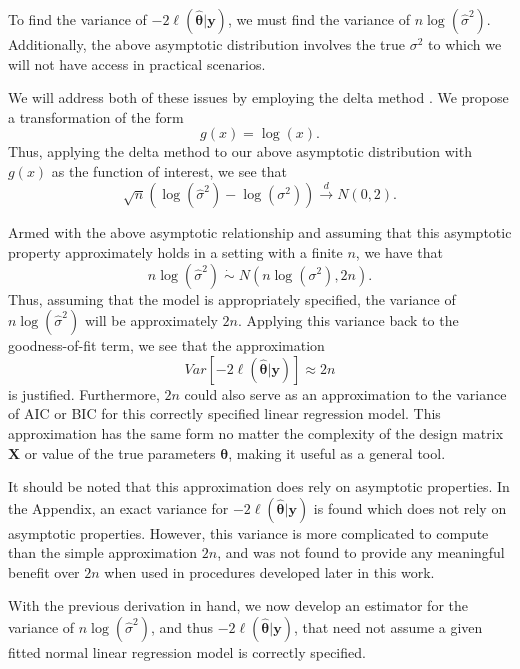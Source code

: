 \documentclass[review]{elsarticle}
\begin{document}
		To find the variance of $-2 \ell (\hat{\bm{\theta}} | \bm{y}  )$, we must find the variance of $n \log(\hat{\sigma}^2)$.
		Additionally, the above asymptotic distribution involves the true $\sigma^2$ to which we will not have access in practical scenarios.

		We will address both of these issues by employing the delta method \citep{Rao}. We propose a transformation of the form
		\begin{equation*}
			g(x) = \log(x) .
		\end{equation*}
		Thus, applying the delta method to our above asymptotic distribution with $g(x)$ as the function of interest, we see that
		\begin{equation*}
			\sqrt{n} ( \log (\hat{\sigma}^2) - \log(\sigma^2)) \xrightarrow[]{d} N(0, 2) .
		\end{equation*}

		Armed with the above asymptotic relationship and assuming that this asymptotic property approximately holds in a setting with a finite $n$, we have that
		\begin{equation*}
			n\log(\hat{\sigma}^2) \; \dot\sim \; N \left( n\log(\sigma^2), 2n \right) .
		\end{equation*}
		Thus, assuming that the model is appropriately specified, the variance of $n\log(\hat{\sigma}^2)$ will be approximately $2n$. Applying this variance back to the goodness-of-fit term,
		we see that the approximation
		\begin{equation*}
			Var \left[ -2 \ell (\hat{\bm{\theta}} | \bm{y}  ) \right] \approx 2n
		\end{equation*}
		is justified. Furthermore, $2n$ could also serve as an approximation to the variance of AIC or BIC for this correctly specified linear regression model. This approximation
		has the same form no matter the complexity of the design matrix $\bm{X}$ or value of the true parameters $\bm{\theta}$, making it useful as a
		general tool.

		It should be noted that this approximation does rely on asymptotic properties. In the Appendix, an exact variance for $-2 \ell (\hat{\bm{\theta}} | \bm{y})$ is found which does
		not rely on asymptotic properties. However, this variance is more complicated to compute than the simple approximation $2n$, and was not found to provide any meaningful
		benefit over $2n$ when used in procedures developed later in this work.

		With the previous derivation in hand, we now develop an estimator for the variance of $n\log(\hat{\sigma}^2)$, and thus $-2 \ell (\hat{\bm{\theta}} | \bm{y})$,
		that need not assume a given fitted normal linear regression model is correctly specified.
\end{document}
